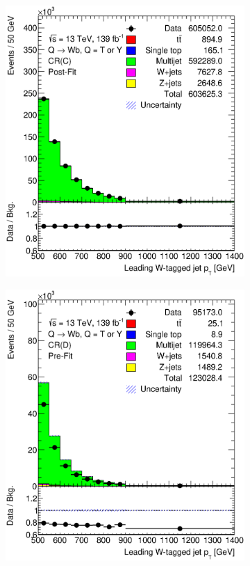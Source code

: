 \begin{figure}[hbt!]
\begin{subfigure}{.35\textwidth}
		\includegraphics[width=\linewidth,height=\textheight,keepaspectratio]{CR_C_ljet_pt_postFit.eps}
		\caption{}
	\end{subfigure}
	\begin{subfigure}{.35\textwidth}
		\centering
		\includegraphics[width=\linewidth,height=\textheight,keepaspectratio]{CR_D_ljet_pt.eps}

\end{subfigure}
\end{figure}
